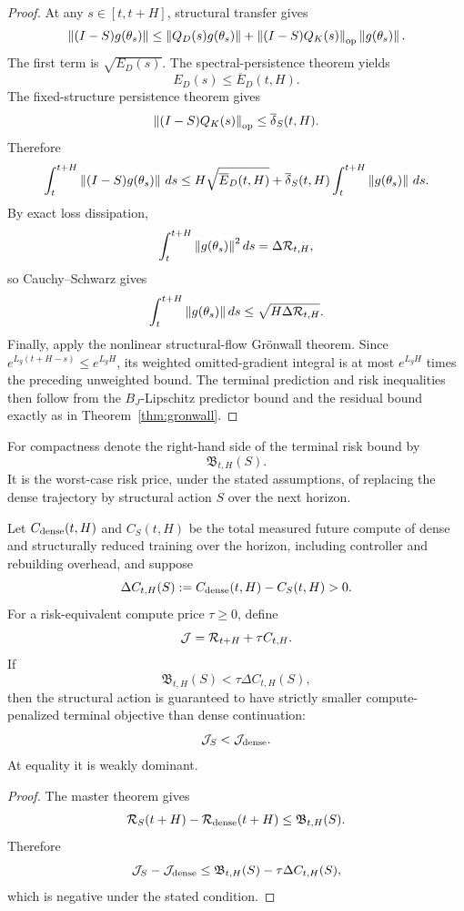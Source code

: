 \begin{proof}
At any $s\in[t,t+H]$, structural transfer gives
\[
\left\lVert (I-S)g(\theta_s)\right\rVert
\le
\left\lVert Q_D(s)g(\theta_s)\right\rVert
+\left\lVert (I-S)Q_K(s)\right\rVert_{\mathrm{op}}\left\lVert g(\theta_s)\right\rVert.
\]
The first term is $\sqrt{E_D(s)}$. The spectral-persistence theorem yields
\[
E_D(s)\le\overline E_D(t,H).
\]
The fixed-structure persistence theorem gives
\[
\left\lVert (I-S)Q_K(s)\right\rVert_{\mathrm{op}}
\le\overline\delta_S(t,H).
\]
Therefore
\[
\int_t^{t+H}\left\lVert (I-S)g(\theta_s)\right\rVert\,ds
\le
H\sqrt{\overline E_D(t,H)}
+\overline\delta_S(t,H)
\int_t^{t+H}\left\lVert g(\theta_s)\right\rVert\,ds.
\]
By exact loss dissipation,
\[
\int_t^{t+H}\left\lVert g(\theta_s)\right\rVert^2ds
=\Delta\mathcal R_{t,H},
\]
so Cauchy--Schwarz gives
\[
\int_t^{t+H}\left\lVert g(\theta_s)\right\rVert ds
\le\sqrt{H\Delta\mathcal R_{t,H}}.
\]
Finally, apply the nonlinear structural-flow Gr\"onwall theorem. Since
$e^{L_g(t+H-s)}\le e^{L_gH}$, its weighted omitted-gradient integral is at most $e^{L_gH}$ times the preceding unweighted bound. The terminal prediction and risk inequalities then follow from the $B_J$-Lipschitz predictor bound and the residual bound exactly as in Theorem~\ref{thm:gronwall}.
\end{proof}

For compactness denote the right-hand side of the terminal risk bound by
\[
\mathfrak B_{t,H}(S).
\]
It is the worst-case risk price, under the stated assumptions, of replacing the dense trajectory by structural action $S$ over the next horizon.

\begin{corollary}\label{cor:compute-dominance}
Let $C_{\rm dense}(t,H)$ and $C_S(t,H)$ be the total measured future compute of dense and structurally reduced training over the horizon, including controller and rebuilding overhead, and suppose
\[
\Delta C_{t,H}(S)
:=C_{\rm dense}(t,H)-C_S(t,H)>0.
\]
For a risk-equivalent compute price $\tau\ge0$, define
\[
\mathcal J=\mathcal R_{t+H}+\tau C_{t,H}.
\]
If
\[
\boxed{\mathfrak B_{t,H}(S)<\tau\Delta C_{t,H}(S),}
\]
then the structural action is guaranteed to have strictly smaller compute-penalized terminal objective than dense continuation:
\[
\mathcal J_S<\mathcal J_{\rm dense}.
\]
At equality it is weakly dominant.
\end{corollary}

\begin{proof}
The master theorem gives
\[
\mathcal R_S(t+H)-\mathcal R_{\rm dense}(t+H)\le\mathfrak B_{t,H}(S).
\]
Therefore
\[
\mathcal J_S-\mathcal J_{\rm dense}
\le
\mathfrak B_{t,H}(S)-\tau\Delta C_{t,H}(S),
\]
which is negative under the stated condition.
\end{proof}

